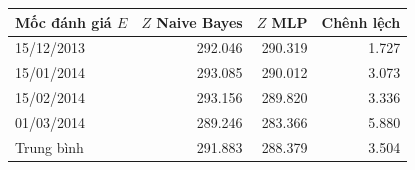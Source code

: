 \begin{tabular}{lrrr}
\toprule
Mốc đánh giá $E$ & $Z$ Naive Bayes & $Z$ MLP & Chênh lệch \\
\midrule
15/12/2013 & 292.046 & 290.319 & 1.727 \\
15/01/2014 & 293.085 & 290.012 & 3.073 \\
15/02/2014 & 293.156 & 289.820 & 3.336 \\
01/03/2014 & 289.246 & 283.366 & 5.880 \\
Trung bình & 291.883 & 288.379 & 3.504 \\
\bottomrule
\end{tabular}
